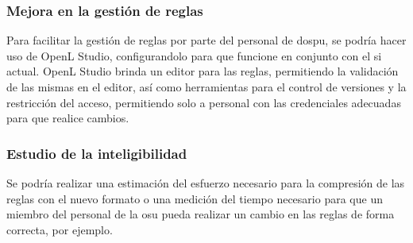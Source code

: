 \subsubsection{Mejora en la gestión de reglas}
Para facilitar la gestión de reglas por parte del personal de \acrshort{dospu}, se podría hacer uso de OpenL Studio, configurandolo para que funcione en conjunto con el \acrshort{si} actual. OpenL Studio brinda un editor para las reglas, permitiendo la validación de las mismas en el editor, así como herramientas para el control de versiones y la restricción del acceso, permitiendo solo a personal con las credenciales adecuadas para que realice cambios.

\subsubsection{Estudio de la inteligibilidad}
Se podría realizar una estimación del esfuerzo necesario para la compresión de las reglas con el nuevo formato o una medición del tiempo necesario para que un miembro del personal de la \acrshort{osu} pueda realizar un cambio en las reglas de forma correcta, por ejemplo.
